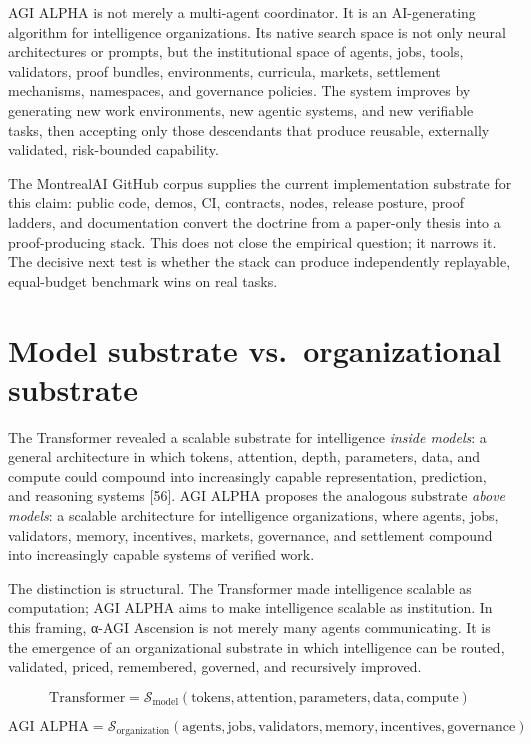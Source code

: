 \documentclass[
  11pt,
]{article}
\begin{document}
AGI ALPHA is not merely a multi-agent coordinator. It is an
AI-generating algorithm for intelligence organizations. Its native
search space is not only neural architectures or prompts, but the
institutional space of agents, jobs, tools, validators, proof bundles,
environments, curricula, markets, settlement mechanisms, namespaces, and
governance policies. The system improves by generating new work
environments, new agentic systems, and new verifiable tasks, then
accepting only those descendants that produce reusable, externally
validated, risk-bounded capability.

The MontrealAI GitHub corpus supplies the current implementation
substrate for this claim: public code, demos, CI, contracts, nodes,
release posture, proof ladders, and documentation convert the doctrine
from a paper-only thesis into a proof-producing stack. This does not
close the empirical question; it narrows it. The decisive next test is
whether the stack can produce independently replayable, equal-budget
benchmark wins on real tasks.

\section{Model substrate vs.~organizational
substrate}\label{model-substrate-vs.-organizational-substrate}

The Transformer revealed a scalable substrate for intelligence
\emph{inside models}: a general architecture in which tokens, attention,
depth, parameters, data, and compute could compound into increasingly
capable representation, prediction, and reasoning systems {[}56{]}. AGI
ALPHA proposes the analogous substrate \emph{above models}: a scalable
architecture for intelligence organizations, where agents, jobs,
validators, memory, incentives, markets, governance, and settlement
compound into increasingly capable systems of verified work.

The distinction is structural. The Transformer made intelligence
scalable as computation; AGI ALPHA aims to make intelligence scalable as
institution. In this framing, α-AGI Ascension is not merely many agents
communicating. It is the emergence of an organizational substrate in
which intelligence can be routed, validated, priced, remembered,
governed, and recursively improved.

\[
\text{Transformer}=\mathcal{S}_{\text{model}}(\text{tokens},\text{attention},\text{parameters},\text{data},\text{compute})
\]

\[
\text{AGI ALPHA}=\mathcal{S}_{\text{organization}}(\text{agents},\text{jobs},\text{validators},\text{memory},\text{incentives},\text{governance})
\]
\end{document}
